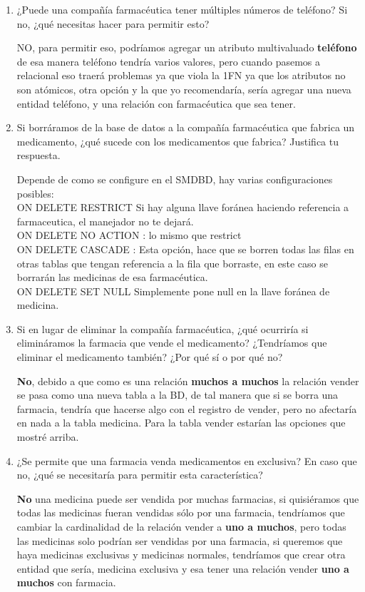 \documentclass{article}
\begin{document}
\begin{enumerate}
\begin{enumerate}
    \item ¿Puede una compañía farmacéutica tener múltiples números de teléfono? Si no, ¿qué necesitas hacer para permitir
    esto? 
    \par\null\par
    NO, para permitir eso, podríamos agregar un atributo multivaluado \textbf{teléfono} de esa manera teléfono tendría varios valores, pero cuando pasemos a relacional eso traerá problemas ya que viola la 1FN ya que los atributos no son atómicos, otra opción y la que yo recomendaría, sería agregar una nueva entidad teléfono, y una relación con farmacéutica que sea tener.
    \item Si borráramos de la base de datos a la compañía farmacéutica que fabrica un medicamento, ¿qué sucede con los
    medicamentos que fabrica? Justifica tu respuesta.
    \par\null\par
    Depende de como se configure en el SMDBD, hay varias configuraciones posibles:\\
    ON DELETE RESTRICT Si hay alguna llave foránea haciendo referencia a farmaceutica, el manejador no te dejará.\\
    ON DELETE NO ACTION : lo mismo que restrict\\
    ON DELETE CASCADE : Esta opción, hace que se borren todas las filas en otras tablas que tengan referencia a la fila que borraste, en este caso se borrarán las medicinas de esa farmacéutica.\\
    ON DELETE SET NULL Simplemente pone null en la llave foránea de medicina.
    \item Si en lugar de eliminar la compañía farmacéutica, ¿qué ocurriría si elimináramos la farmacia que vende el
    medicamento? ¿Tendríamos que eliminar el medicamento también? ¿Por qué sí o por qué no?\par\null\par
    \textbf{No}, debido a que como es una relación \textbf{muchos a muchos} la relación vender se pasa como una nueva tabla a la BD, de tal manera que si se borra una farmacia, tendría que hacerse algo con el registro de vender, pero no afectaría en nada a la tabla medicina. Para la tabla vender estarían las opciones que mostré arriba.
    \item ¿Se permite que una farmacia venda medicamentos en exclusiva? En caso que no, ¿qué se necesitaría para permitir
    esta característica? 
    \par\null\par
    \textbf{No} una medicina puede ser vendida por muchas farmacias, si quisiéramos que todas las medicinas fueran vendidas sólo por una farmacia, tendríamos que cambiar la cardinalidad de la relación vender a \textbf{uno a muchos}, pero todas las medicinas solo podrían ser vendidas por una farmacia, si queremos que haya medicinas exclusivas y medicinas normales, tendríamos que crear otra entidad que sería, medicina exclusiva y esa tener una relación vender \textbf{uno a muchos} con farmacia.


\end{enumerate}
\end{enumerate}
\end{document}
